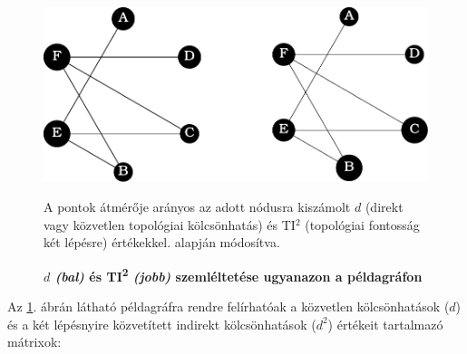 \documentclass[a4paper,12pt]{article}
\begin{document}
 	 \begin{figure}[H]
 		 \includegraphics[scale=1]{img/graphs.pdf}
 		 \centering
 		 \caption{\textbf{$d$ \textit{(bal)} és TI\textsuperscript{2} \textit{(jobb)} szemléltetése ugyanazon a példagráfon} }
 		 A pontok átmérője arányos az adott nódusra kiszámolt $d$ (direkt vagy közvetlen topológiai kölcsönhatás) és TI$^2$ (topológiai fontosság két lépésre) értékekkel. \cite{ti} alapján módosítva.
 		 \label{fig:peldagraph}
 	 \end{figure}
 	 
 	 Az \ref{fig:peldagraph}. ábrán látható példagráfra rendre felírhatóak a közvetlen  kölcsönhatások ($d$) és a két lépésnyire közvetített indirekt kölcsönhatások ($d^2$) értékeit tartalmazó mátrixok:
	
\end{document}
